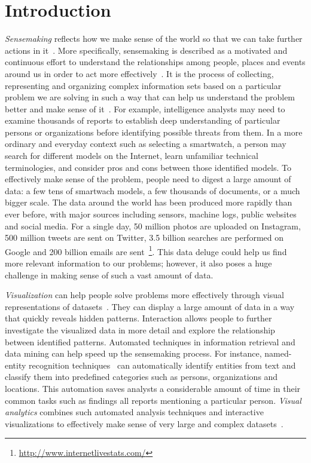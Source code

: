 \chapter{Introduction}
\label{chap:intro}

\graphicspath{{Chapter1/figures/}}

\emph{Sensemaking} reflects how we make sense of the world so that we can take further actions in it~\cite{Snowden2005}. More specifically, sensemaking is described as a motivated and continuous effort to understand the relationships among people, places and events around us in order to act more effectively~\cite{Klein2006a}. It is the process of collecting, representing and organizing complex information sets based on a particular problem we are solving in such a way that can help us understand the problem better and make sense of it~\cite{Russell2008}. For example, intelligence analysts may need to examine thousands of reports to establish deep understanding of particular persons or organizations before identifying possible threats from them. In a more ordinary and everyday context such as selecting a smartwatch, a person may search for different models on the Internet, learn unfamiliar technical terminologies, and consider pros and cons between those identified models. To effectively make sense of the problem, people need to digest a large amount of data: a few tens of smartwach models, a few thousands of documents, or a much bigger scale. The data around the world has been produced more rapidly than ever before, with major sources including sensors, machine logs, public websites and social media. For a single day, 50 million photos are uploaded on Instagram, 500 million tweets are sent on Twitter, 3.5 billion searches are performed on Google and 200 billion emails are sent~\footnote{\url{http://www.internetlivestats.com/}}. This data deluge could help us find more relevant information to our problems; however, it also poses a huge challenge in making sense of such a vast amount of data.

\emph{Visualization} can help people solve problems more effectively through visual representations of datasets~\cite{Munzner2014}. They can display a large amount of data in a way that quickly reveals hidden patterns. Interaction allows people to further investigate the visualized data in more detail and explore the relationship between identified patterns. Automated techniques in information retrieval and data mining can help speed up the sensemaking process. For instance, named-entity recognition techniques~\cite{Nadeau2007} can automatically identify entities from text and classify them into predefined categories such as persons, organizations and locations. This automation saves analysts a considerable amount of time in their common tasks such as findings all reports mentioning a particular person. \emph{Visual analytics} combines such automated analysis techniques and interactive visualizations to effectively make sense of very large and complex datasets~\cite{Keim2010}.

